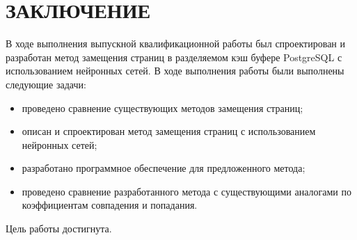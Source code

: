 \chapter*{ЗАКЛЮЧЕНИЕ}

В ходе выполнения выпускной квалификационной работы был спроектирован и разработан метод замещения страниц в разделяемом кэш буфере PostgreSQL с использованием нейронных сетей. В ходе выполнения работы были выполнены следующие задачи:
\begin{itemize}
	\item проведено сравнение существующих методов замещения страниц;
	\item описан и спроектирован метод замещения страниц с использованием нейронных сетей;
	\item разработано программное обеспечение для предложенного метода;
	\item проведено сравнение разработанного метода с существующими аналогами по коэффициентам совпадения и попадания.
\end{itemize}

Цель работы достигнута.